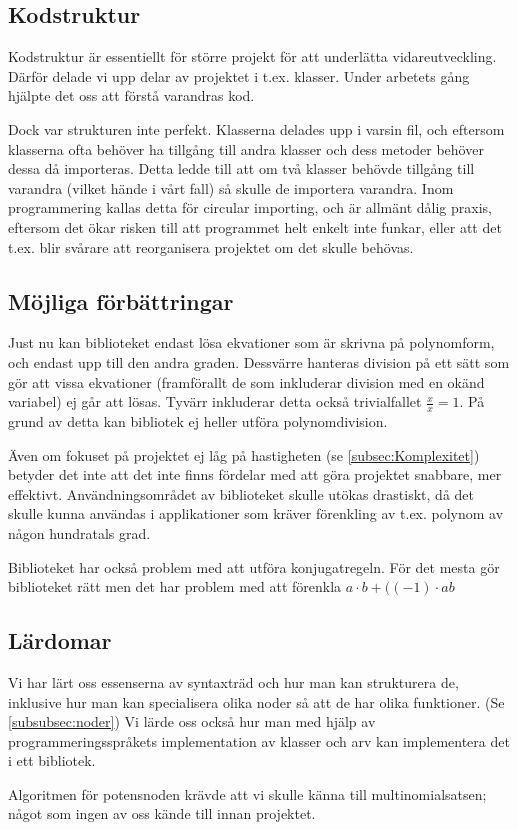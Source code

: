 \documentclass[12pt,a4paper]{article}
\begin{document}
\subsection{Kodstruktur}
Kodstruktur är essentiellt för större projekt för att underlätta vidareutveckling. Därför delade vi upp delar av projektet i t.ex. klasser. Under arbetets gång hjälpte det oss att förstå varandras kod.
\par
Dock var strukturen inte perfekt. Klasserna delades upp i varsin fil, och eftersom klasserna ofta behöver ha tillgång till andra klasser och dess metoder behöver dessa då importeras. Detta ledde till att om två klasser behövde tillgång till varandra (vilket hände i vårt fall) så skulle de importera varandra. Inom programmering kallas detta för circular importing, och är allmänt dålig praxis, eftersom det ökar risken till att programmet helt enkelt inte funkar, eller att det t.ex. blir svårare att reorganisera projektet om det skulle behövas.
\subsection{Möjliga förbättringar}
Just nu kan biblioteket endast lösa ekvationer som är skrivna på polynomform, och endast upp till den andra graden. Dessvärre hanteras division på ett sätt som gör att vissa ekvationer (framförallt de som inkluderar division med en okänd variabel) ej går att lösas. Tyvärr inkluderar detta också trivialfallet \( \frac{x}{x} = 1 \). På grund av detta kan bibliotek ej heller utföra polynomdivision.
\par
Även om fokuset på projektet ej låg på hastigheten (se \ref{subsec:Komplexitet}) betyder det inte att det inte finns fördelar med att göra projektet snabbare, mer effektivt. Användningsområdet av biblioteket skulle utökas drastiskt, då det skulle kunna användas i applikationer som kräver förenkling av t.ex. polynom av någon hundratals grad.
\par
Biblioteket har också problem med att utföra konjugatregeln. För det mesta gör biblioteket rätt men det har problem med att förenkla \( a \cdot b + ((-1) \cdot ab\)
\subsection{Lärdomar}
Vi har lärt oss essenserna av syntaxträd och hur man kan strukturera de, inklusive hur man kan specialisera olika noder så att de har olika funktioner. (Se \ref{subsubsec:noder}) Vi lärde oss också hur man med hjälp av programmeringsspråkets implementation av klasser och arv kan implementera det i ett bibliotek.
\par
Algoritmen för potensnoden krävde att vi skulle känna till multinomialsatsen; något som ingen av oss kände till innan projektet.
\end{document}
